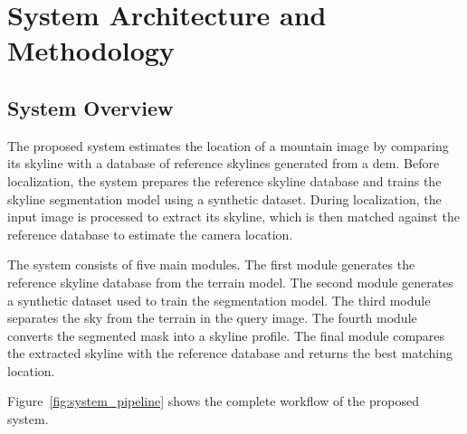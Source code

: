 \chapter{System Architecture and Methodology}

\section{System Overview}

The proposed system estimates the location of a mountain image by comparing its skyline with a database of reference skylines generated from a \gls{dem}. Before localization, the system prepares the reference skyline database and trains the skyline segmentation model using a synthetic dataset. During localization, the input image is processed to extract its skyline, which is then matched against the reference database to estimate the camera location.

The system consists of five main modules. The first module generates the reference skyline database from the terrain model. The second module generates a synthetic dataset used to train the segmentation model. The third module separates the sky from the terrain in the query image. The fourth module converts the segmented mask into a skyline profile. The final module compares the extracted skyline with the reference database and returns the best matching location.

Figure~\ref{fig:system_pipeline} shows the complete workflow of the proposed system.

